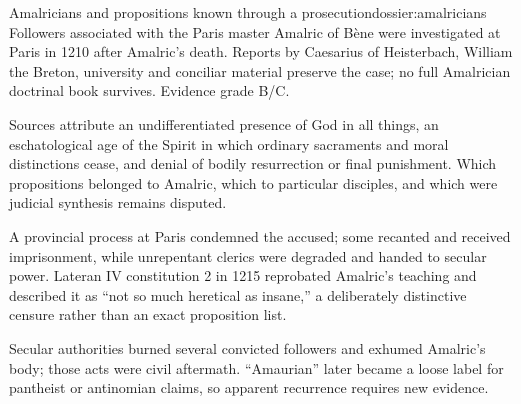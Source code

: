 \begin{heresydossier}{Amalricians and propositions known through a prosecution}{dossier:amalricians}
\objectfield Followers associated with the Paris master Amalric of B\`ene were investigated at Paris in 1210 after Amalric's death. Reports by Caesarius of Heisterbach, William the Breton, university and conciliar material preserve the case; no full Amalrician doctrinal book survives. Evidence grade B/C.

\propositionfield Sources attribute an undifferentiated presence of God in all things, an eschatological age of the Spirit in which ordinary sacraments and moral distinctions cease, and denial of bodily resurrection or final punishment. Which propositions belonged to Amalric, which to particular disciples, and which were judicial synthesis remains disputed.

\responsefield A provincial process at Paris condemned the accused; some recanted and received imprisonment, while unrepentant clerics were degraded and handed to secular power. Lateran IV constitution 2 in 1215 reprobated Amalric's teaching and described it as ``not so much heretical as insane,'' a deliberately distinctive censure rather than an exact proposition list.

\aftermathfield Secular authorities burned several convicted followers and exhumed Amalric's body; those acts were civil aftermath. ``Amaurian'' later became a loose label for pantheist or antinomian claims, so apparent recurrence requires new evidence.
\end{heresydossier}

